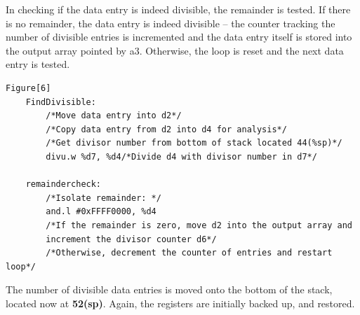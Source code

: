 \documentclass[12pt]{article}
\begin{document}
In checking if the data entry is indeed divisible, the remainder is tested. If there is no remainder, the data entry is indeed divisible -- the counter tracking the number of divisible entries is incremented and the data entry itself is stored into the output array pointed by a3. Otherwise, the loop is reset and the next data entry is tested.

\begin{verbatim}
Figure[6]
    FindDivisible:
        /*Move data entry into d2*/
        /*Copy data entry from d2 into d4 for analysis*/
        /*Get divisor number from bottom of stack located 44(%sp)*/
        divu.w %d7, %d4/*Divide d4 with divisor number in d7*/
    
    remaindercheck:
        /*Isolate remainder: */
        and.l #0xFFFF0000, %d4
        /*If the remainder is zero, move d2 into the output array and
        increment the divisor counter d6*/
        /*Otherwise, decrement the counter of entries and restart loop*/
\end{verbatim}

The number of divisible data entries is moved onto the bottom of the stack, located now at \textbf{52(sp)}. Again, the registers are initially backed up, and restored.
\end{document}

